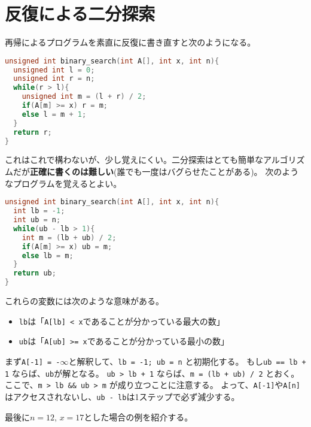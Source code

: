 \documentclass[a4paper,twoside,onecolumn,openany,article,10pt]{memoir}
\theoremstyle{remark}
\begin{document}
\section{反復による二分探索}
再帰によるプログラムを素直に反復に書き直すと次のようになる。
\begin{lstlisting}[basicstyle=\ttfamily\normalsize,showstringspaces=false,language=C,frame=single]
unsigned int binary_search(int A[], int x, int n){
  unsigned int l = 0;
  unsigned int r = n;
  while(r > l){
    unsigned int m = (l + r) / 2;
    if(A[m] >= x) r = m;
    else l = m + 1;
  }
  return r;
}
\end{lstlisting}
これはこれで構わないが、少し覚えにくい。二分探索はとても簡単なアルゴリズムだが\textbf{正確に書くのは難しい}(誰でも一度はバグらせたことがある)。
次のようなプログラムを覚えるとよい。
\begin{lstlisting}[basicstyle=\ttfamily\normalsize,showstringspaces=false,language=C,frame=single]
unsigned int binary_search(int A[], int x, int n){
  int lb = -1;
  int ub = n;
  while(ub - lb > 1){
    int m = (lb + ub) / 2;
    if(A[m] >= x) ub = m;
    else lb = m;
  }
  return ub;
}
\end{lstlisting}
これらの変数には次のような意味がある。
\begin{itemize}
\item \texttt{lb}は「\texttt{A[lb] < x}であることが分かっている最大の数」
\item \texttt{ub}は「\texttt{A[ub] >= x}であることが分かっている最小の数」
\end{itemize}
まず\texttt{A[-1] = -$\infty$}と解釈して、\texttt{lb = -1; ub = n} と初期化する。
もし\texttt{ub == lb + 1} ならば、\texttt{ub}が解となる。
\texttt{ub > lb + 1} ならば、\texttt{m = (lb + ub) / 2} とおく。
ここで、\texttt{m > lb \&\& ub > m} が成り立つことに注意する。
よって、\texttt{A[-1]}や\texttt{A[n]}はアクセスされないし、\texttt{ub - lb}は1ステップで必ず減少する。


最後に$n=12,\, x = 17$とした場合の例を紹介する。

\begin{center}
\end{center}
\end{document}
